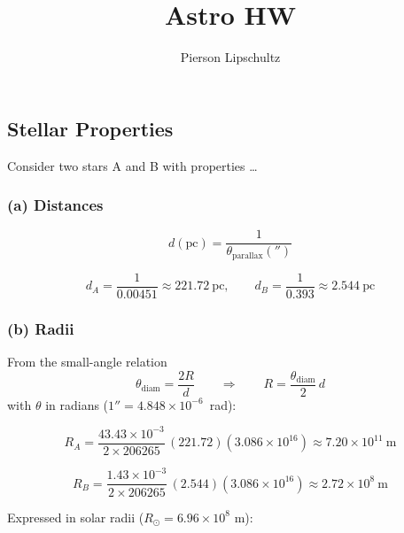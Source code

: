 \documentclass{article}
\title{Astro HW \hwNUM}
\author{Pierson Lipschultz}
\def\hwNUM{8}
\begin{document}
\maketitle


\setcounter{section}{\hwNUM}
\subsection{Stellar Properties}

Consider two stars A and B with properties \dots

\begin{table}[htbp]
\end{table}

\subsubsection*{(a) Distances}

\[
d(\mathrm{pc}) = \frac{1}{\theta_\mathrm{parallax}('')}
\]

\[
d_A = \frac{1}{0.00451} \approx 221.72~\mathrm{pc}, \qquad
d_B = \frac{1}{0.393} \approx 2.544~\mathrm{pc}
\]

\subsubsection*{(b) Radii}

From the small-angle relation
\[
\theta_\mathrm{diam} = \frac{2R}{d} \qquad \Rightarrow \qquad R = \frac{\theta_\mathrm{diam}}{2}\,d
\]
with $\theta$ in radians ($1'' = 4.848\times10^{-6}$~rad):

\[
R_A = \frac{43.43\times10^{-3}}{2\times206265}\,(221.72)(3.086\times10^{16})
   \approx 7.20\times10^{11}~\mathrm{m}
\]

\[
R_B = \frac{1.43\times10^{-3}}{2\times206265}\,(2.544)(3.086\times10^{16})
   \approx 2.72\times10^{8}~\mathrm{m}
\]

Expressed in solar radii ($R_\odot=6.96\times10^{8}$ m):
\end{document}
